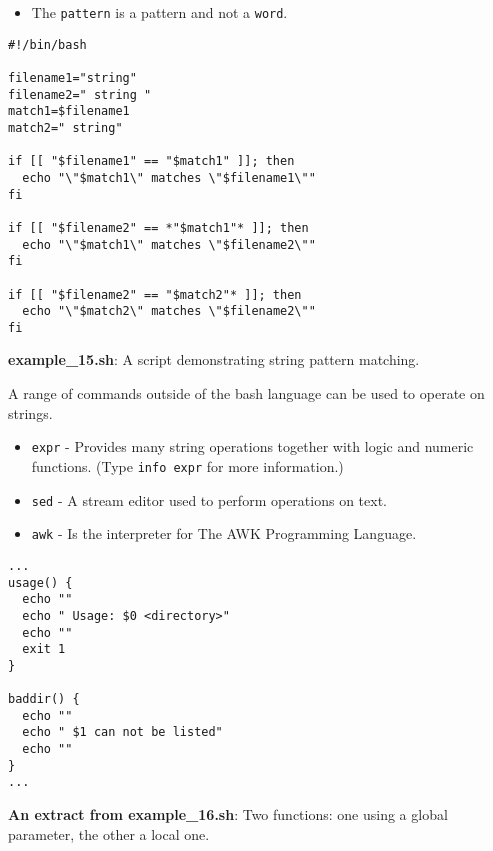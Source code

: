 \documentclass[17pt,dvips]{foils}
\begin{document}
\begin{itemize}
\item The \texttt{pattern} is a pattern and not a \texttt{word}.
\end{itemize}


\begin{verbatim}
#!/bin/bash

filename1="string"
filename2=" string "
match1=$filename1
match2=" string"

if [[ "$filename1" == "$match1" ]]; then
  echo "\"$match1\" matches \"$filename1\""
fi
 
if [[ "$filename2" == *"$match1"* ]]; then
  echo "\"$match1\" matches \"$filename2\""
fi

if [[ "$filename2" == "$match2"* ]]; then
  echo "\"$match2\" matches \"$filename2\""
fi
\end{verbatim}
{\bf example\_15.sh}: A script demonstrating string pattern matching.



A range of commands outside of the bash language can be used to operate on 
strings.
\begin{itemize}
\item \texttt{expr} - Provides many string operations together with logic and numeric functions.  (Type \texttt{info expr} for more information.) 
\item \texttt{sed} -  A stream editor used to perform operations on text.
\item \texttt{awk} - Is the interpreter for The AWK Programming Language.
\end{itemize} 


\begin{verbatim}
...
usage() {
  echo ""
  echo " Usage: $0 <directory>"
  echo ""
  exit 1
}

baddir() {
  echo ""
  echo " $1 can not be listed"
  echo ""
}
...
\end{verbatim}
{\bf An extract from example\_16.sh}: Two functions: one using a global parameter, the other a local one.

\end{document}
